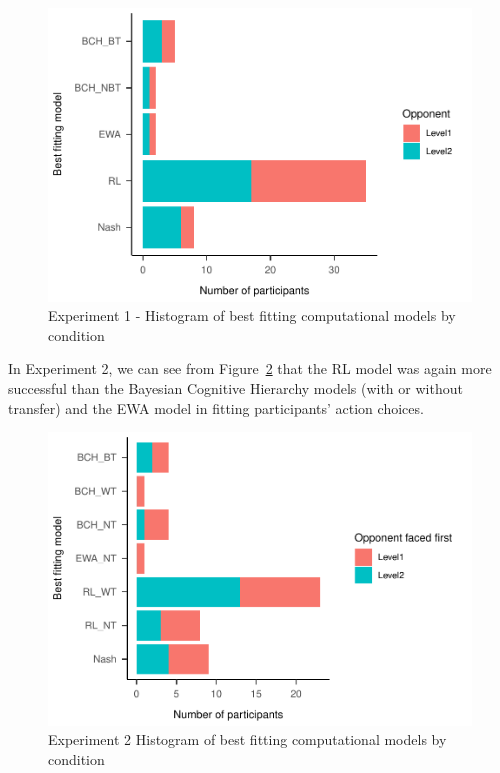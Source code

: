 \documentclass[man,floatsintext]{apa6}
\begin{document}
\begin{figure}

{\centering \includegraphics[width=\textwidth]{paper_draft_2021_files/figure-latex/exp1-comp-models-1} 

}

\caption{Experiment 1 - Histogram of best fitting computational models by condition}\label{fig:exp1-comp-models}
\end{figure}



In Experiment 2, we can see from Figure~\ref{fig:exp2-comp-models} that the RL model was again more successful than the Bayesian Cognitive Hierarchy models (with or without transfer) and the EWA model in fitting participants' action choices.

\begin{figure}

{\centering \includegraphics[width=\textwidth]{paper_draft_2021_files/figure-latex/exp2-comp-models-1} 

}

\caption{Experiment 2 Histogram of best fitting computational models by condition}\label{fig:exp2-comp-models}
\end{figure}
\end{document}
